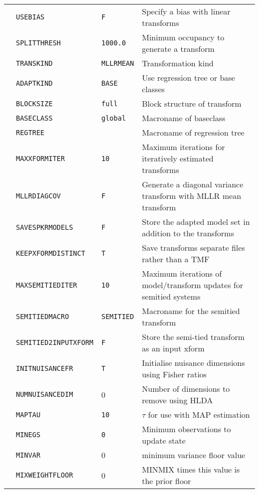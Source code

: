 \begin{center}
\begin{supertabular}{|p{1.8cm}|l|l|p{6.6cm}|}
  & \texttt{USEBIAS} & \texttt{F} & Specify a bias with linear transforms \\ 
  & \texttt{SPLITTHRESH} & \texttt{1000.0} & Minimum occupancy to generate a transform \\ 
  & \texttt{TRANSKIND} & \texttt{{\tt MLLRMEAN}} & Transformation kind \\ 
  & \texttt{ADAPTKIND} & \texttt{{\tt BASE}} & Use regression tree or base classes \\ 
  & \texttt{BLOCKSIZE} & \texttt{full} & Block structure of transform\\ 
  & \texttt{BASECLASS} & \texttt{global} & Macroname of baseclass\\ 
  & \texttt{REGTREE} & \texttt{} & Macroname of regression tree\\ 
   & \texttt{MAXXFORMITER} & \texttt{10} & Maximum iterations for iteratively estimated transforms \\ 
  & \texttt{MLLRDIAGCOV} & \texttt{F} & Generate a diagonal variance transform with MLLR mean transform \\ 
  & \texttt{SAVESPKRMODELS} & \texttt{F} & Store the adapted model set in addition to the transforms \\ 
  & \texttt{KEEPXFORMDISTINCT} & \texttt{T} & Save transforms separate files rather than a TMF \\ 
  & \texttt{MAXSEMITIEDITER} & \texttt{10} & Maximum iterations of model/transform updates for semitied systems \\ 
  & \texttt{SEMITIEDMACRO} & \texttt{SEMITIED} & Macroname for the semitied transform\\ 
  & \texttt{SEMITIED2INPUTXFORM} & \texttt{F} & Store the semi-tied transform as an input xform\\ 
  & \texttt{INITNUISANCEFR} & \texttt{T} & Initialise nuisance dimensions using Fisher ratios\\ 
  & \texttt{NUMNUISANCEDIM} & 0 & Number of dimensions to remove using HLDA\\ \hline



  & \texttt{MAPTAU} & \texttt{10} & $\tau$ for use with MAP estimation \\ 
  & \texttt{MINEGS} & \texttt{0} & Minimum observations to update state \\ 
  & \texttt{MINVAR} & 0 & minimum variance floor value \\ 
  & \texttt{MIXWEIGHTFLOOR} & 0 & MINMIX times this value is the prior floor \\ \hline


\end{supertabular}
\end{center}
